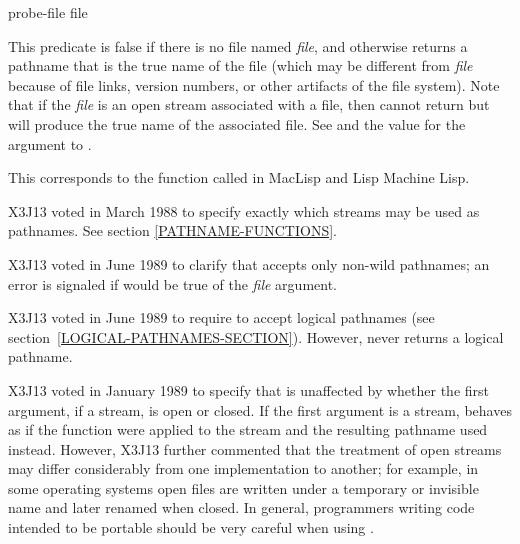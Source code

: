 \begin{defun}[Function]
probe-file file

This predicate is false if there is no file named \emph{file},
and otherwise returns a pathname that is the true name of the file
(which may be different from \emph{file} because of file links, version
numbers, or other artifacts of the file system).
Note that if the \emph{file} is an open stream associated with a file,
then  cannot return {\nil} but will produce the
true name of the associated file.
See  and the  value for the
 argument to .

\beforenoterule
\begin{incompatibility}
This corresponds to the function
called  in MacLisp and Lisp Machine Lisp.
\end{incompatibility}
\afternoterule

\begin{new}
X3J13 voted in March 1988
to specify exactly which streams may be used as pathnames.
See section \ref{PATHNAME-FUNCTIONS}.
\end{new}

\begin{newer}
X3J13 voted in June 1989 
to clarify that  accepts only non-wild pathnames;
an error is signaled if  would be true of
the \emph{file} argument.
\end{newer}

\begin{newer}
X3J13 voted in June 1989  to require 
to accept logical pathnames (see section~\ref{LOGICAL-PATHNAMES-SECTION}).
However,  never returns a logical pathname.
\end{newer}

\begin{new}
X3J13 voted in January 1989
to specify that  is unaffected by
whether the first argument, if a stream, is open or closed. If the first
argument is a stream,  behaves as if the function 
were applied to the stream and the resulting pathname used instead.
However, X3J13 further commented that the treatment of open streams
may differ considerably from one implementation to another; for example,
in some operating systems open files are written under a temporary or
invisible name and later renamed when closed.  In general, programmers writing
code intended to be portable should be very careful when using .
\end{new}
\end{defun}

